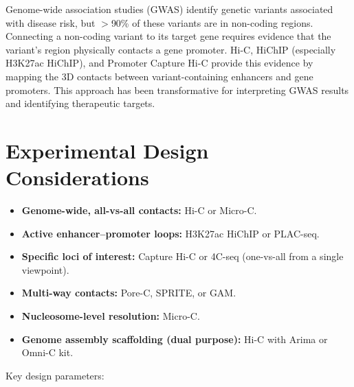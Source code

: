 \begin{keyconcept}[title={Linking Non-Coding Variants to Target Genes}]
Genome-wide association studies (GWAS) identify genetic variants associated with disease risk, but $>$90\% of these variants are in non-coding regions. Connecting a non-coding variant to its target gene requires evidence that the variant's region physically contacts a gene promoter. Hi-C, HiChIP (especially H3K27ac HiChIP), and Promoter Capture Hi-C provide this evidence by mapping the 3D contacts between variant-containing enhancers and gene promoters. This approach has been transformative for interpreting GWAS results and identifying therapeutic targets.
\end{keyconcept}

\section{Experimental Design Considerations}
\label{sec:3dgenome:design}

\begin{keyconcept}[title={Choosing a 3D Genome Method}]
\begin{itemize}[itemsep=2pt]
  \item \textbf{Genome-wide, all-vs-all contacts:} Hi-C or Micro-C.
  \item \textbf{Active enhancer--promoter loops:} H3K27ac HiChIP or PLAC-seq.
  \item \textbf{Specific loci of interest:} Capture Hi-C or 4C-seq (one-vs-all from a single viewpoint).
  \item \textbf{Multi-way contacts:} Pore-C, SPRITE, or GAM.
  \item \textbf{Nucleosome-level resolution:} Micro-C.
  \item \textbf{Genome assembly scaffolding (dual purpose):} Hi-C with Arima or Omni-C kit.
\end{itemize}
\end{keyconcept}

Key design parameters:

